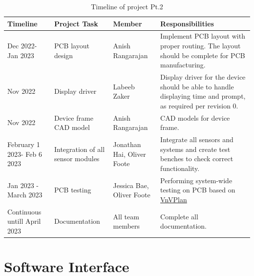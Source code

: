 \documentclass[12pt, titlepage]{article}
\begin{document}
\begin{table}[H]
\caption{\label{Timeline}Timeline of project Pt.2}  
	\begin{tabular}{ | p{2.25cm} | p{4cm} |  p{3.5cm} | p{5.5cm} |}
		 \hline
		 \textbf{Timeline} & \textbf{Project Task} & \textbf{Member} & \textbf{Responsibilities}\\
		 \hline
		Dec 2022\newline - Jan 2023 & PCB layout design & Anish Rangarajan  & Implement PCB layout with proper routing. The layout should be complete for PCB manufacturing.\\
		\hline
		Nov 2022 & Display driver& Labeeb Zaker & Display driver for the device should be able to handle displaying time and prompt, as required per revision 0.\\
		\hline
		Nov 2022 & Device frame CAD model & Anish Rangarajan & CAD models for device frame.\\
		\hline
		 February 1 2023\newline- Feb 6 2023 & Integration of all sensor modules & Jonathan Hai, Oliver Foote & Integrate all sensors and systems and create test benches to check correct functionality.\\
		\hline
			Jan 2023 \newline-March 2023 & PCB testing  & Jessica Bae, Oliver Foote & Performing system-wide testing on PCB based on \href{https://github.com/zakerl/Capstone_Project/blob/main/docs/VnVPlan/VnVPlan.pdf}{VnVPlan} \\
		\hline
		Continuous untill April 2023 & Documentation & All team members & Complete all documentation.\\
		\hline
	\end{tabular}
\end{table}


% 

\newpage{}

\appendix

\section{Software Interface}
\label{Software_UI}
\end{document}
